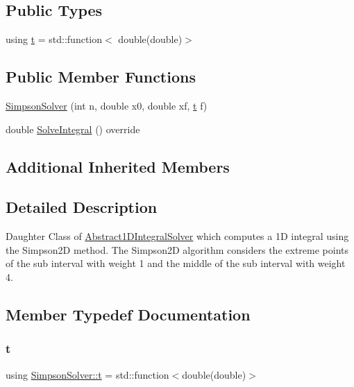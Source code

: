 \subsection*{Public Types}
\begin{DoxyCompactItemize}
\item 
using \hyperlink{class_simpson_solver_aa31ea3c884d669836ba1d0399aa53479}{t} = std\+::function$<$ double(double)$>$
\end{DoxyCompactItemize}
\subsection*{Public Member Functions}
\begin{DoxyCompactItemize}
\item 
\hyperlink{class_simpson_solver_abc9059969016bce44332013d48baeed2}{Simpson\+Solver} (int n, double x0, double xf, \hyperlink{class_abstract1_d_integral_solver_a7d8e60dfe7eb70e5c19dd71ac0b03880}{t} f)
\item 
double \hyperlink{class_simpson_solver_a4843e8bfc0344d9a9cae8688d1114667}{Solve\+Integral} () override
\end{DoxyCompactItemize}
\subsection*{Additional Inherited Members}


\subsection{Detailed Description}
Daughter Class of \hyperlink{class_abstract1_d_integral_solver}{Abstract1\+D\+Integral\+Solver} which computes a 1D integral using the Simpson2D method. The Simpson2D algorithm considers the extreme points of the sub interval with weight 1 and the middle of the sub interval with weight 4. 

\subsection{Member Typedef Documentation}
\mbox{\label{class_simpson_solver_aa31ea3c884d669836ba1d0399aa53479}} 
\subsubsection{\texorpdfstring{t}{t}}
{\footnotesize\ttfamily using \hyperlink{class_simpson_solver_aa31ea3c884d669836ba1d0399aa53479}{Simpson\+Solver\+::t} =  std\+::function$<$double(double)$>$}

